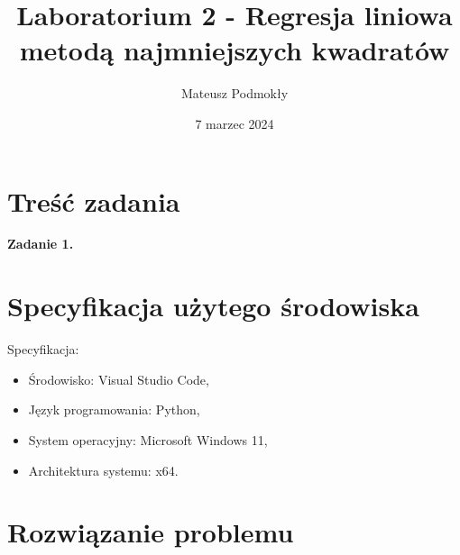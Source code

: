 \documentclass[11pt]{scrartcl}
\title{Laboratorium 2 - Regresja liniowa metodą najmniejszych kwadratów}
\author{Mateusz Podmokły}
\date{7 marzec 2024}
\begin{document}
    \maketitle

    \section{Treść zadania}
    \textbf{Zadanie 1.}
    

    \section{Specyfikacja użytego środowiska}
    Specyfikacja:

    \begin{itemize}
        \item Środowisko: Visual Studio Code,
        \item Język programowania: Python,
        \item System operacyjny: Microsoft Windows 11,
        \item Architektura systemu: x64.
    \end{itemize}

    \section{Rozwiązanie problemu}
\end{document}
